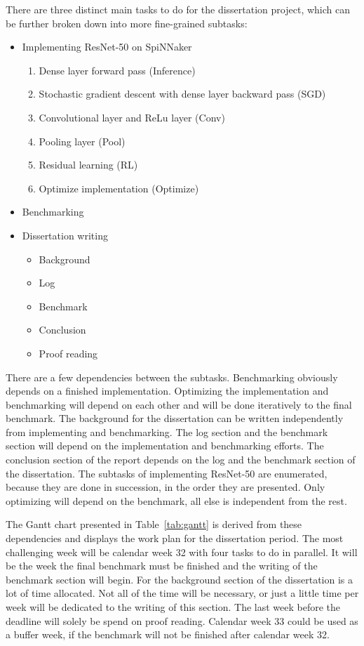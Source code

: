 \documentclass{article}
\begin{document}
There are three distinct main tasks to do for the
dissertation project, which can be further broken
down into more fine-grained subtasks:
\begin{itemize}
  \item Implementing ResNet-50 on SpiNNaker
    \begin{enumerate}
      \item Dense layer forward pass (Inference)
        \citep[see][]{goodfellow2016}
      \item Stochastic gradient descent with dense layer
        backward pass (SGD) \citep[see][]{goodfellow2016}
      \item Convolutional layer and ReLu layer (Conv)
        \citep[see][]{goodfellow2016}
      \item Pooling layer (Pool)
        \citep[see][]{goodfellow2016}
      \item Residual learning (RL)
        \citep[see][]{he_et_al_2015}
      \item Optimize implementation (Optimize)
    \end{enumerate}
  \item Benchmarking
  \item Dissertation writing
    \begin{itemize}
      \item Background
      \item Log
      \item Benchmark
      \item Conclusion
      \item Proof reading
    \end{itemize}
\end{itemize}
There are a few dependencies between the subtasks.
Benchmarking obviously depends on a finished
implementation.
Optimizing the implementation and benchmarking will depend
on each other and will be done iteratively to the final
benchmark.
The background for the dissertation can be written
independently from implementing and benchmarking.
The log section and the benchmark section will depend on
the implementation and benchmarking efforts.
The conclusion section of the report depends on the log and
the benchmark section of the dissertation.
The subtasks of implementing ResNet-50 are enumerated,
because they are done in succession, in the order they
are presented.
Only optimizing will depend on the benchmark, all else is
independent from the rest.

The Gantt chart presented in Table~\ref{tab:gantt} is
derived from these dependencies and displays the work plan
for the dissertation period.
The most challenging week will be calendar week 32 with
four tasks to do in parallel.
It will be the week the final benchmark must be finished
and the writing of the benchmark section will begin.
For the background section of the dissertation is a lot of
time allocated.
Not all of the time will be necessary, or just a little
time per week will be dedicated to the writing of this
section.
The last week before the deadline will solely be spend on
proof reading.
Calendar week 33 could be used as a buffer week, if
the benchmark will not be finished after calendar week 32.
\end{document}
